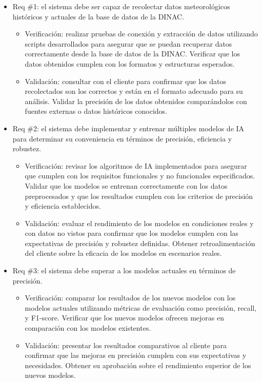 \documentclass[
11pt, %
codirector, %
]{charter}
\begin{document}
\begin{itemize} 
\item Req \#1: el sistema debe ser capaz de recolectar datos meteorológicos históricos y actuales de la base de datos de la DINAC.

\begin{itemize}
	\item Verificación: realizar pruebas de conexión y extracción de datos utilizando scripts desarrollados para asegurar que se puedan recuperar datos correctamente desde la base de datos de la DINAC. Verificar que los datos obtenidos cumplen con los formatos y estructuras esperados.
	\item Validación: consultar con el cliente para confirmar que los datos recolectados son los correctos y están en el formato adecuado para su análisis. Validar la precisión de los datos obtenidos comparándolos con fuentes externas o datos históricos conocidos.
\end{itemize}

\item Req \#2: el sistema debe implementar y entrenar múltiples modelos de IA para determinar su conveniencia en términos de precisión, eficiencia y robustez.

\begin{itemize}
	\item Verificación: revisar los algoritmos de IA implementados para asegurar que cumplen con los requisitos funcionales y no funcionales especificados. Validar que los modelos se entrenan correctamente con los datos preprocesados y que los resultados cumplen con los criterios de precisión y eficiencia establecidos.
	\item Validación: evaluar el rendimiento de los modelos en condiciones reales y con datos no vistos para confirmar que los modelos cumplen con las expectativas de precisión y robustez definidas. Obtener retroalimentación del cliente sobre la eficacia de los modelos en escenarios reales.
\end{itemize}

\item Req \#3: el sistema debe superar a los modelos actuales en términos de precisión.

\begin{itemize}
	\item Verificación: comparar los resultados de los nuevos modelos con los modelos actuales utilizando métricas de evaluación como precisión, recall, y F1-score. Verificar que los nuevos modelos ofrecen mejoras en comparación con los modelos existentes.
	\item Validación: presentar los resultados comparativos al cliente para confirmar que las mejoras en precisión cumplen con sus expectativas y necesidades. Obtener su aprobación sobre el rendimiento superior de los nuevos modelos.
\end{itemize}


\end{itemize}
\end{document}
